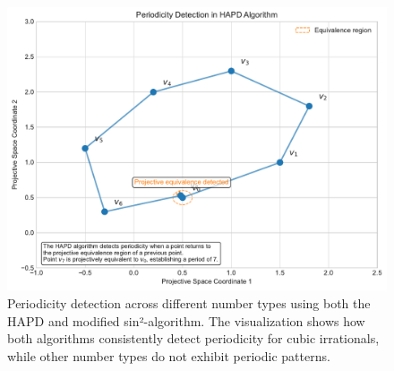 \begin{figure}[htbp]
\begin{minipage}{\textwidth}
\centering
\includegraphics[width=\textwidth]{figures/output/periodicity_detection.pdf}
\caption{Periodicity detection across different number types using both the HAPD and modified sin²-algorithm. The visualization shows how both algorithms consistently detect periodicity for cubic irrationals, while other number types do not exhibit periodic patterns.}
\label{fig:periodicity_detection}
\end{minipage}
\end{figure}

